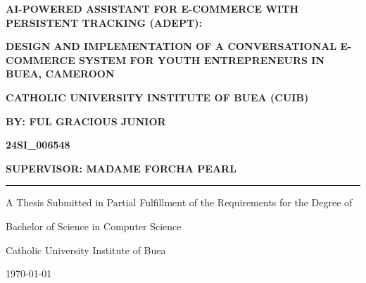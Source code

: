 \documentclass[12pt,a4paper]{article}
\begin{document}
\begin{titlepage}
    \centering
    \vspace*{1cm}
    
    {\LARGE\bfseries AI-POWERED ASSISTANT FOR E-COMMERCE WITH PERSISTENT TRACKING (ADEPT):}
    
    \vspace{0.5cm}
    
    {\LARGE\bfseries DESIGN AND IMPLEMENTATION OF A CONVERSATIONAL E-COMMERCE SYSTEM FOR YOUTH ENTREPRENEURS IN BUEA, CAMEROON}
    
    \vspace{2cm}
    
    {\large\textbf{CATHOLIC UNIVERSITY INSTITUTE OF BUEA (CUIB)}}
    
    \vspace{2cm}
    
    {\large\textbf{BY: FUL GRACIOUS JUNIOR}}
    
    \vspace{0.5cm}
    
    {\large\textbf{24SI\_006548}}
    
    \vspace{0.5cm}
    
    {\large\textbf{SUPERVISOR: MADAME FORCHA PEARL}}
    
    \vspace{2cm}
    
    \rule{0.8\textwidth}{0.4pt}
    
    \vspace{1cm}
    
    {\large A Thesis Submitted in Partial Fulfillment of the Requirements for the Degree of}
    
    \vspace{0.5cm}
    
    {\large Bachelor of Science in Computer Science}
    
    \vspace{0.5cm}
    
    {\large Catholic University Institute of Buea}
    
    \vspace{1cm}
    
    {\large \today}
    
\end{titlepage}

\newpage

\end{document}
